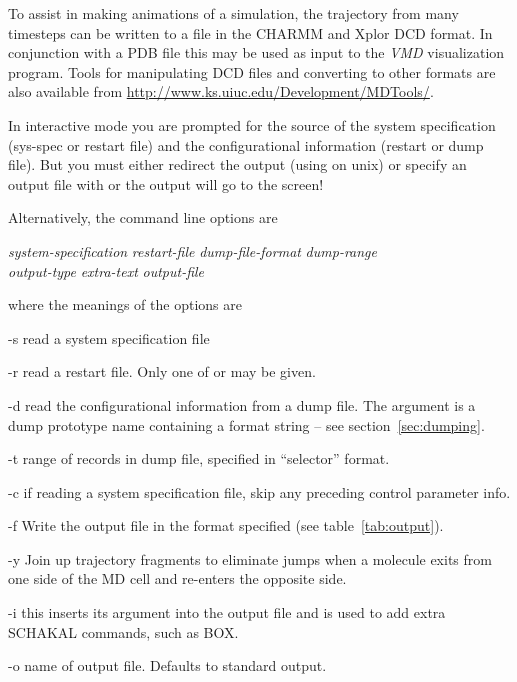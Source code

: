 \documentclass[a4paper,twoside]{report}
\begin{document}
To assist in making animations of a simulation, the trajectory from
many timesteps can be written to a file in the  CHARMM and Xplor DCD
format.  In conjunction with a PDB file
this may be used as input to the \emph{VMD} visualization program.  Tools for
manipulating DCD files and converting to other formats are also
available from \url{http://www.ks.uiuc.edu/Development/MDTools/}.

In interactive mode you are prompted for the source of the system
specification (sys-spec or restart file) and the configurational
information (restart or dump file).  But you must either redirect the
output (using \Lit{>} on unix) or specify an output file with 
or the output will go to the screen!

Alternatively, the command line options are
\begin{center}
\Lit{[-s} \textit{system-specification} \Lit{|}
 \textit{restart-file}\Lit{]}
\Lit{[-d} \textit{dump-file-format}\Lit{]}
\Lit{[-t} \textit{dump-range}\Lit{]} \\
\Lit{[-c]}
\Lit{[-f} \textit{output-type}\Lit{]}
\Lit{[-y]}
\Lit{[-i} \textit{extra-text}\Lit{]}
\Lit{[-o} \textit{output-file}\Lit{]}
\end{center}
where the meanings of the options are
\begin{Argdescription}
\item[-s] read a system specification file
\item[-r] read a restart file.  Only one of  or  may
be given.
\item[-d] read the configurational information from a dump file.  The
argument is a dump prototype name containing a  format
string -- see section~\ref{sec:dumping}.
\item[-t] range of records in dump file, specified in ``selector''
format.
\item[-c] if reading a system specification file, skip any preceding
control parameter info.
\item[-f] Write the output file in the format specified (see table~\ref{tab:output}).
\item[-y] Join up trajectory fragments to eliminate jumps when a
  molecule exits from one side of the MD cell and re-enters the
  opposite side.
\item[-i]   this inserts its argument into the output file and is used
to add extra SCHAKAL commands, such as BOX.
\item[-o] name of output file. Defaults to standard output.
\end{Argdescription}
\end{document}
